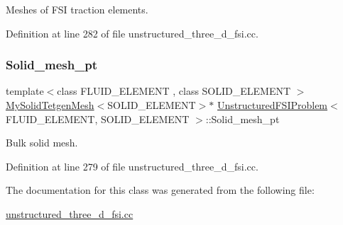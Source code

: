Meshes of F\+SI traction elements. 



Definition at line 282 of file unstructured\+\_\+three\+\_\+d\+\_\+fsi.\+cc.

\mbox{\label{classUnstructuredFSIProblem_a54debe981843ae9c7a40de65229698a3}} 
\subsubsection{\texorpdfstring{Solid\+\_\+mesh\+\_\+pt}{Solid\_mesh\_pt}}
{\footnotesize\ttfamily template$<$class F\+L\+U\+I\+D\+\_\+\+E\+L\+E\+M\+E\+NT , class S\+O\+L\+I\+D\+\_\+\+E\+L\+E\+M\+E\+NT $>$ \\
\hyperlink{classMySolidTetgenMesh}{My\+Solid\+Tetgen\+Mesh}$<$S\+O\+L\+I\+D\+\_\+\+E\+L\+E\+M\+E\+NT$>$$\ast$ \hyperlink{classUnstructuredFSIProblem}{Unstructured\+F\+S\+I\+Problem}$<$ F\+L\+U\+I\+D\+\_\+\+E\+L\+E\+M\+E\+NT, S\+O\+L\+I\+D\+\_\+\+E\+L\+E\+M\+E\+NT $>$\+::Solid\+\_\+mesh\+\_\+pt\hspace{0.3cm}{\ttfamily [private]}}



Bulk solid mesh. 



Definition at line 279 of file unstructured\+\_\+three\+\_\+d\+\_\+fsi.\+cc.



The documentation for this class was generated from the following file\+:\begin{DoxyCompactItemize}
\item 
\hyperlink{unstructured__three__d__fsi_8cc}{unstructured\+\_\+three\+\_\+d\+\_\+fsi.\+cc}\end{DoxyCompactItemize}
